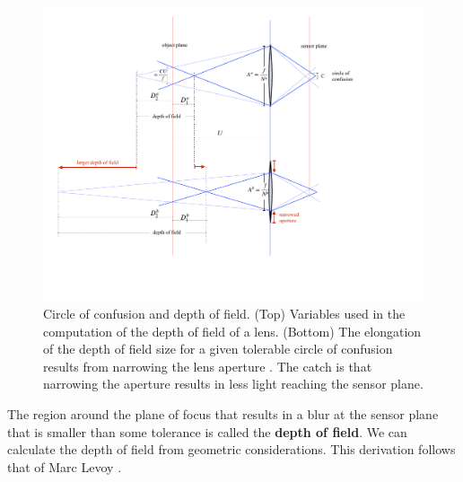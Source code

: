 \begin{figure}
\centerline{
\includegraphics[width=1\linewidth]{figures/imaging/dof.pdf}}
\caption{Circle of confusion and depth of field.  (Top) Variables used in the computation of the depth of field of a lens.  (Bottom) The elongation of the depth of field size for a given tolerable circle of confusion results from narrowing the lens aperture \cite{Levoy2010}. The catch is that narrowing the aperture results in less light reaching the sensor plane.}
\label{fig:DOFformula}
\end{figure}

The region around the plane of focus that results in a blur at the sensor plane that is smaller than some tolerance is called the {\bf depth of field}.  We can calculate the depth of field from geometric considerations. This derivation follows that of Marc Levoy \cite{Levoy2010}.


